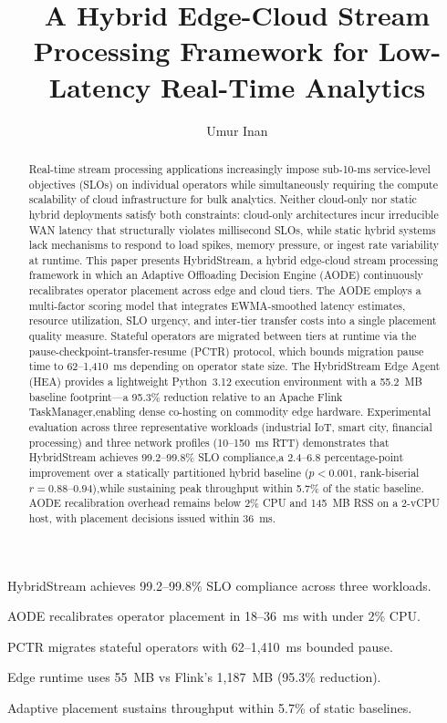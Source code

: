 \documentclass[preprint,review,12pt]{elsarticle}
\begin{document}
\begin{frontmatter}

\title{A Hybrid Edge-Cloud Stream Processing Framework for Low-Latency Real-Time Analytics}

\author[sol]{Umur Inan}

\begin{abstract}
Real-time stream processing applications increasingly impose sub-10-ms service-level objectives (SLOs) on individual operators while simultaneously requiring the compute scalability of cloud infrastructure for bulk analytics. Neither cloud-only nor static hybrid deployments satisfy both constraints: cloud-only architectures incur irreducible WAN latency that structurally violates millisecond SLOs, while static hybrid systems lack mechanisms to respond to load spikes, memory pressure, or ingest rate variability at runtime. This paper presents HybridStream, a hybrid edge-cloud stream processing framework in which an Adaptive Offloading Decision Engine (AODE) continuously recalibrates operator placement across edge and cloud tiers. The AODE employs a multi-factor scoring model that integrates EWMA-smoothed latency estimates, resource utilization, SLO urgency, and inter-tier transfer costs into a single placement quality measure. Stateful operators are migrated between tiers at runtime via the pause-checkpoint-transfer-resume (PCTR) protocol, which bounds migration pause time to 62--1,410~ms depending on operator state size. The HybridStream Edge Agent (HEA) provides a lightweight Python~3.12 execution environment with a 55.2~MB baseline footprint---a 95.3\% reduction relative to an Apache Flink TaskManager,enabling dense co-hosting on commodity edge hardware. Experimental evaluation across three representative workloads (industrial IoT, smart city, financial processing) and three network profiles (10--150~ms RTT) demonstrates that HybridStream achieves 99.2--99.8\% SLO compliance,a 2.4--6.8 percentage-point improvement over a statically partitioned hybrid baseline ($p < 0.001$, rank-biserial $r = 0.88$--$0.94$),while sustaining peak throughput within 5.7\% of the static baseline. AODE recalibration overhead remains below 2\% CPU and 145~MB RSS on a 2-vCPU host, with placement decisions issued within 36~ms.
\end{abstract}

\begin{highlights}
\item HybridStream achieves 99.2--99.8\% SLO compliance across three workloads.
\item AODE recalibrates operator placement in 18--36~ms with under 2\% CPU.
\item PCTR migrates stateful operators with 62--1,410~ms bounded pause.
\item Edge runtime uses 55~MB vs Flink's 1,187~MB (95.3\% reduction).
\item Adaptive placement sustains throughput within 5.7\% of static baselines.
\end{highlights}


\end{frontmatter}
\end{document}
